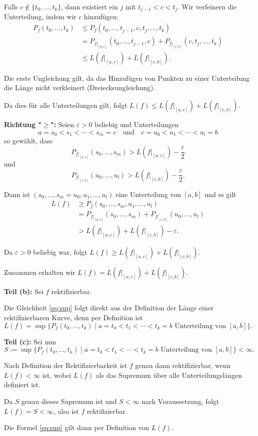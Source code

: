 \documentclass{article}
\begin{document}
Falls $c \notin \{t_0,\dots,t_k\}$, dann existiert ein $j$ mit $t_{j-1} < c < t_j$. Wir verfeinern die Unterteilung, indem wir $c$ hinzufügen:
\begin{align}
P_f(t_0,\dots,t_k) &\leq P_f(t_0,\dots,t_{j-1},c,t_j,\dots,t_k)\\
&= P_{f|_{[a,c]}}(t_0,\dots,t_{j-1},c) + P_{f|_{[c,b]}}(c,t_j,\dots,t_k)\\
&\leq L(f|_{[a,c]}) + L(f|_{[c,b]}).
\end{align}

Die erste Ungleichung gilt, da das Hinzufügen von Punkten zu einer Unterteilung die Länge nicht verkleinert (Dreiecksungleichung).

Da dies für alle Unterteilungen gilt, folgt $L(f) \leq L(f|_{[a,c]}) + L(f|_{[c,b]})$.

\textbf{Richtung "$\geq$":} Seien $\varepsilon > 0$ beliebig und Unterteilungen 
$$a = s_0 < s_1 < \cdots < s_m = c \quad \text{und} \quad c = u_0 < u_1 < \cdots < u_l = b$$
so gewählt, dass
$$P_{f|_{[a,c]}}(s_0,\dots,s_m) > L(f|_{[a,c]}) - \frac{\varepsilon}{2}$$
und
$$P_{f|_{[c,b]}}(u_0,\dots,u_l) > L(f|_{[c,b]}) - \frac{\varepsilon}{2}.$$

Dann ist $(s_0,\dots,s_m=u_0,u_1,\dots,u_l)$ eine Unterteilung von $[a,b]$ und es gilt
\begin{align}
L(f) &\geq P_f(s_0,\dots,s_m,u_1,\dots,u_l)\\
&= P_{f|_{[a,c]}}(s_0,\dots,s_m) + P_{f|_{[c,b]}}(u_0,\dots,u_l)\\
&> L(f|_{[a,c]}) + L(f|_{[c,b]}) - \varepsilon.
\end{align}

Da $\varepsilon > 0$ beliebig war, folgt $L(f) \geq L(f|_{[a,c]}) + L(f|_{[c,b]})$.

Zusammen erhalten wir $L(f) = L(f|_{[a,c]}) + L(f|_{[c,b]})$.

\textbf{Teil (b):} Sei $f$ rektifizierbar. 

Die Gleichheit \eqref{eq:sup} folgt direkt aus der Definition der Länge einer rektifizierbaren Kurve, denn per Definition ist
$$L(f) = \sup\{P_f(t_0,\dots,t_k) \mid a=t_0<t_1<\cdots<t_k=b \text{ Unterteilung von }[a,b]\}.$$

\textbf{Teil (c):} Sei nun
$$S := \sup\{P_f(t_0,\dots,t_k) \mid a=t_0<t_1<\cdots<t_k=b \text{ Unterteilung von }[a,b]\} < \infty.$$

Nach Definition der Rektifizierbarkeit ist $f$ genau dann rektifizierbar, wenn $L(f) < \infty$ ist, wobei $L(f)$ als das Supremum über alle Unterteilungslängen definiert ist. 

Da $S$ genau dieses Supremum ist und $S < \infty$ nach Voraussetzung, folgt $L(f) = S < \infty$, also ist $f$ rektifizierbar.

Die Formel \eqref{eq:sup} gilt dann per Definition von $L(f)$.
\end{document}
